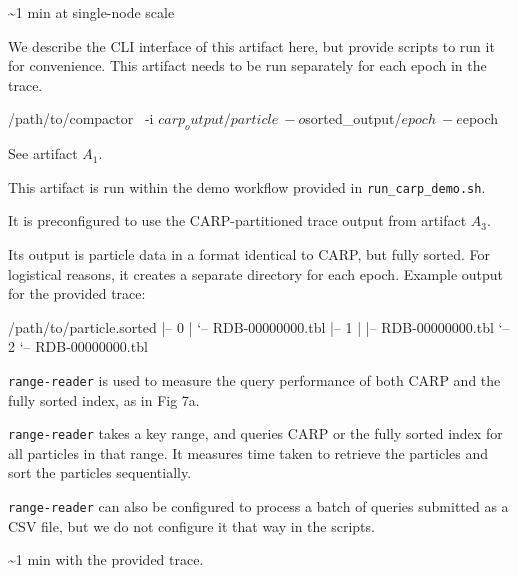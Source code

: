 \documentclass[conference]{IEEEtran}
\newenvironment{example}
{\minted[bgcolor=GhostWhite,fontsize=\small]{text}}
{\endminted}
\begin{document}
\arttime

\textasciitilde1 min at single-node scale

\artin

We describe the CLI interface of this artifact here, but provide scripts to run it for convenience. This artifact needs to be run separately for each epoch in the trace.

\begin{example}
/path/to/compactor \
    -i $carp_output/particle \
    -o $sorted_output/$epoch \
    -e $epoch
\end{example}

\artcomp

 See artifact $A_1$.

 This artifact is run within the demo workflow provided in \texttt{run\_carp\_demo.sh}.

It is preconfigured to use the CARP-partitioned trace output from artifact $A_3$.

\artout

Its output is particle data in a format identical to CARP, but fully sorted. For logistical reasons, it creates a separate directory for each epoch. Example output for the provided trace:

\begin{example}
/path/to/particle.sorted
|-- 0
|   `-- RDB-00000000.tbl
|-- 1
|   |-- RDB-00000000.tbl
`-- 2
    `-- RDB-00000000.tbl

\end{example}


\newartifact

\artrel

\texttt{range-reader} is used to measure the query performance of both CARP and the fully sorted index, as in Fig 7a.

\artexp

\texttt{range-reader} takes a key range, and queries CARP or the fully sorted index for all particles in that range. It measures time taken to retrieve the particles and sort the particles sequentially.

\texttt{range-reader} can also be configured to process a batch of queries submitted as a CSV file, but we do not configure it that way in the scripts.

\arttime

\textasciitilde1 min with the provided trace.
\end{document}
